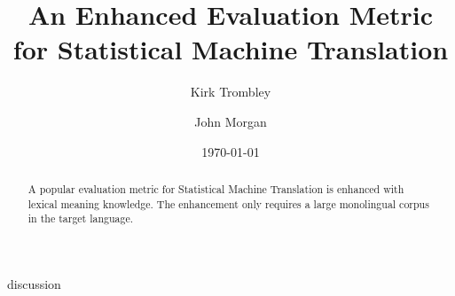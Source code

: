 \documentclass{article}
\title{An Enhanced Evaluation Metric for Statistical Machine Translation}
\author{Kirk Trombley \and John Morgan}
\date{\today}
\begin{document}
\maketitle
\begin{abstract}
A popular evaluation metric for Statistical Machine Translation is enhanced with lexical meaning knowledge. The enhancement only requires a large monolingual corpus in the target language. 
\end{abstract}




discussion


\end{document}
